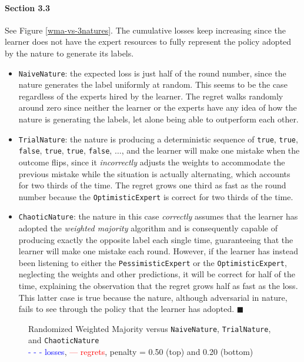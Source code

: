 \documentclass{article}
\newcommand{\qed}{\hfill$\blacksquare$}
\begin{document}
\paragraph{Section 3.3}See Figure \ref{wma-vs-3natures}. The cumulative losses keep increasing since the learner
does not have the expert resources to fully represent the policy adopted by the nature to generate its labels. 
\begin{itemize}
	\item {\tt NaiveNature}: the expected loss is just half of the round number, since the nature generates
		the label uniformly at random. This seems to be the case regardless of the experts hired by the learner. 
		The regret walks randomly around zero since neither the learner or the experts have any idea of how the 
		nature is generating the labels, let alone being able to outperform each other. 
	\item {\tt TrialNature}: the nature is producing a deterministic sequence of {\tt true}, {\tt true}, {\tt false}, 
		{\tt true}, {\tt true}, {\tt false}, $\dots$, and the learner will make one mistake when the outcome flips, 
		since it \emph{incorrectly} adjusts the weights to accommodate the previous mistake while the situation 
		is actually alternating, which accounts for two thirds of the time. The regret grows one third as 
		fast as the round number because the {\tt OptimisticExpert} is correct for two thirds of the time. 
	\item {\tt ChaoticNature}: the nature in this case {\it correctly} assumes that the learner has adopted
		the \emph{weighted majority} algorithm and is consequently capable of producing exactly the opposite
		label each single time, guaranteeing that the learner will make one mistake each round. However, if 
		the learner has instead been listening to either the {\tt PessimisticExpert} or the {\tt OptimisticExpert}, 
		neglecting the weights and other predictions, it will be correct for half of the time, explaining the
		observation that the regret grows half as fast as the loss. This latter case is true because the nature,
		although adversarial in nature, fails to see through the policy that the learner has adopted. \qed
\end{itemize}

\begin{figure}
	\centering{}
	\caption{Randomized Weighted Majority versus {\tt NaiveNature}, {\tt TrialNature}, and {\tt ChaoticNature} \\
		{\footnotesize\textcolor{blue}{- - - losses}, \textcolor{red}{--- regrets}, penalty = 0.50 (top) and 0.20 (bottom)}}
	\label{rwma-vs-3natures}
\end{figure}
\end{document}
